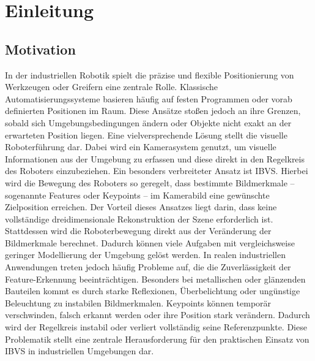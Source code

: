 \chapter{Einleitung}
\label{ch:einleitung}

\section{Motivation}
\label{sec:Motivation}
In der industriellen Robotik spielt die präzise und flexible Positionierung von Werkzeugen oder Greifern eine zentrale Rolle. Klassische Automatisierungssysteme basieren häufig auf festen Programmen oder vorab definierten Positionen im Raum. Diese Ansätze stoßen jedoch an ihre Grenzen, sobald sich Umgebungsbedingungen ändern oder Objekte nicht exakt an der erwarteten Position liegen.
Eine vielversprechende Lösung stellt die visuelle Roboterführung dar. Dabei wird ein Kamerasystem genutzt, um visuelle Informationen aus der Umgebung zu erfassen und diese direkt in den Regelkreis des Roboters einzubeziehen. Ein besonders verbreiteter Ansatz ist \ac{IBVS}. Hierbei wird die Bewegung des Roboters so geregelt, dass bestimmte Bildmerkmale – sogenannte Features oder Keypoints – im Kamerabild eine gewünschte Zielposition erreichen.
Der Vorteil dieses Ansatzes liegt darin, dass keine vollständige dreidimensionale Rekonstruktion der Szene erforderlich ist. Stattdessen wird die Roboterbewegung direkt aus der Veränderung der Bildmerkmale berechnet. Dadurch können viele Aufgaben mit vergleichsweise geringer Modellierung der Umgebung gelöst werden.
In realen industriellen Anwendungen treten jedoch häufig Probleme auf, die die Zuverlässigkeit der Feature-Erkennung beeinträchtigen. Besonders bei metallischen oder glänzenden Bauteilen kommt es durch starke Reflexionen, Überbelichtung oder ungünstige Beleuchtung zu instabilen Bildmerkmalen. Keypoints können temporär verschwinden, falsch erkannt werden oder ihre Position stark verändern. Dadurch wird der Regelkreis instabil oder verliert vollständig seine Referenzpunkte.
Diese Problematik stellt eine zentrale Herausforderung für den praktischen Einsatz von \ac{IBVS} in industriellen Umgebungen dar.


